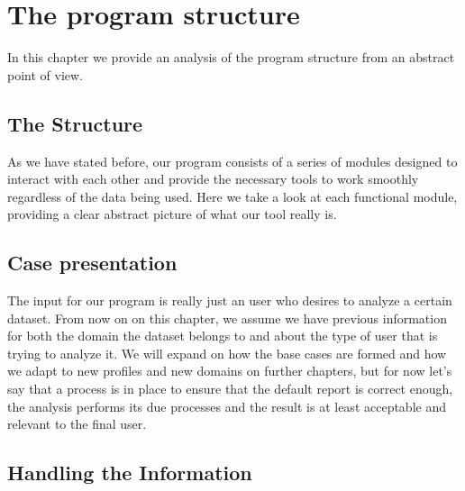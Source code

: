 %
%

\chapter{The program structure}

\begin{resumen}
In this chapter we provide an analysis of the program structure from an abstract point of view.
\end{resumen}


\section{The Structure}
\label{cap2:sec:structure}

As we have stated before, our program consists of a series of modules designed to interact with each other and provide the necessary tools to work smoothly regardless of the data being used.
Here we take a look at each functional module, providing a clear abstract picture of what our tool really is.

\section{Case presentation}
\label{cap2:sec:preparation}

The input for our program is really just an user who desires to analyze a certain dataset.
From now on on this chapter, we assume we have previous information for both the domain the dataset belongs to and about the type of user that is trying to analyze it.
We will expand on how the base cases are formed and how we adapt to new profiles and new domains on further chapters, but for now let's say that a process is in place to ensure that the default report is correct enough, the analysis performs its due processes and the result is at least acceptable and relevant to the final user.

\section{Handling the Information}
\label{cap2:sec:information}

